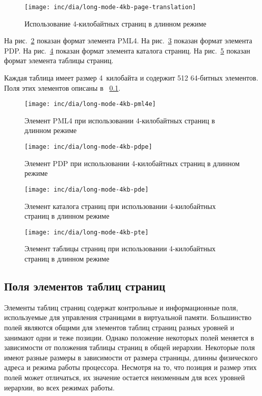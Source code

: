 \begin{figure}[ht!]
  \centering
  \texttt{[image: inc/dia/long-mode-4kb-page-translation]}
  \caption{Использование 4-килобайтных страниц в длинном режиме}
  \label{fig:long-mode-4kb-page-translation}
\end{figure}

На рис.~\ref{fig:long-mode-4kb-pml4e} показан формат элемента PML4.
На рис.~\ref{fig:long-mode-4kb-pdpe} показан формат элемента PDP.
На рис.~\ref{fig:long-mode-4kb-pde} показан формат элемента каталога страниц.
На рис.~\ref{fig:long-mode-4kb-pte} показан формат элемента таблицы страниц.

Каждая таблица имеет размер 4~килобайта и содержит 512 64-битных элементов. Поля этих элементов
описаны в ~\ref{subsec:page_table_fields}.

\begin{figure}[ht!]
  \centering
  \texttt{[image: inc/dia/long-mode-4kb-pml4e]}
  \caption{Элемент PML4 при использовании 4-килобайтных страниц в длинном режиме}
  \label{fig:long-mode-4kb-pml4e}
\end{figure}

\begin{figure}[ht!]
  \centering
  \texttt{[image: inc/dia/long-mode-4kb-pdpe]}
  \caption{Элемент PDP при использовании 4-килобайтных страниц в длинном режиме}
  \label{fig:long-mode-4kb-pdpe}
\end{figure}

\begin{figure}[ht!]
  \centering
  \texttt{[image: inc/dia/long-mode-4kb-pde]}
  \caption{Элемент каталога страниц при использовании 4-килобайтных страниц в длинном режиме}
  \label{fig:long-mode-4kb-pde}
\end{figure}

\begin{figure}[ht!]
  \centering
  \texttt{[image: inc/dia/long-mode-4kb-pte]}
  \caption{Элемент таблицы страниц при использовании 4-килобайтных страниц в длинном режиме}
  \label{fig:long-mode-4kb-pte}
\end{figure}

\subsection{Поля элементов таблиц страниц}
\label{subsec:page_table_fields}
Элементы таблиц страниц содержат контрольные и информационные поля, используемые для управления
страницами в виртуальной памяти. Большинство полей являются общими для элементов таблиц страниц
разных уровней и занимают одни и теже позиции. Однако положение некоторых полей меняется в
зависимости от положения таблицы страниц в общей иерархии. Некоторые поля имеют разные размеры
в зависимости от размера страницы, длинны физического адреса и режима работы процессора. Несмотря на
то, что позиция и размер этих полей может отличаться, их значение остается неизменным для всех
уровней иерархии, во всех режимах работы.

